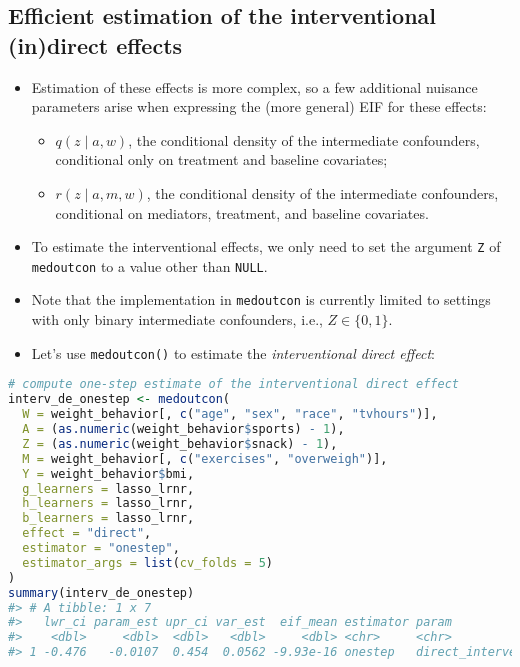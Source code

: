 \documentclass[
  12pt,
]{book}
\newcommand{\passthrough}[1]{#1}
\providecommand{\tightlist}{%
  \setlength{\itemsep}{0pt}\setlength{\parskip}{0pt}}
\theoremstyle{definition}
\theoremstyle{definition}
\theoremstyle{definition}
\newcommand{\1}{\mathbbm{1}}
\begin{document}
\hypertarget{efficient-estimation-of-the-interventional-indirect-effects}{%
\subsection{Efficient estimation of the interventional (in)direct effects}\label{efficient-estimation-of-the-interventional-indirect-effects}}

\begin{itemize}
\tightlist
\item
  Estimation of these effects is more complex, so a few additional nuisance
  parameters arise when expressing the (more general) EIF for these effects:

  \begin{itemize}
  \tightlist
  \item
    \(q(z \mid a, w)\), the conditional density of the intermediate confounders,
    conditional only on treatment and baseline covariates;
  \item
    \(r(z \mid a, m, w)\), the conditional density of the intermediate
    confounders, conditional on mediators, treatment, and baseline covariates.
  \end{itemize}
\item
  To estimate the interventional effects, we only need to set the argument \passthrough{\lstinline!Z!}
  of \passthrough{\lstinline!medoutcon!} to a value other than \passthrough{\lstinline!NULL!}.
\item
  Note that the implementation in \passthrough{\lstinline!medoutcon!} is currently limited to settings
  with only binary intermediate confounders, i.e., \(Z \in \{0, 1\}\).
\item
  Let's use \passthrough{\lstinline!medoutcon()!} to estimate the \emph{interventional direct effect}:
\end{itemize}

\begin{lstlisting}[language=R]
# compute one-step estimate of the interventional direct effect
interv_de_onestep <- medoutcon(
  W = weight_behavior[, c("age", "sex", "race", "tvhours")],
  A = (as.numeric(weight_behavior$sports) - 1),
  Z = (as.numeric(weight_behavior$snack) - 1),
  M = weight_behavior[, c("exercises", "overweigh")],
  Y = weight_behavior$bmi,
  g_learners = lasso_lrnr,
  h_learners = lasso_lrnr,
  b_learners = lasso_lrnr,
  effect = "direct",
  estimator = "onestep",
  estimator_args = list(cv_folds = 5)
)
summary(interv_de_onestep)
#> # A tibble: 1 x 7
#>   lwr_ci param_est upr_ci var_est  eif_mean estimator param                
#>    <dbl>     <dbl>  <dbl>   <dbl>     <dbl> <chr>     <chr>                
#> 1 -0.476   -0.0107  0.454  0.0562 -9.93e-16 onestep   direct_interventional
\end{lstlisting}
\end{document}
